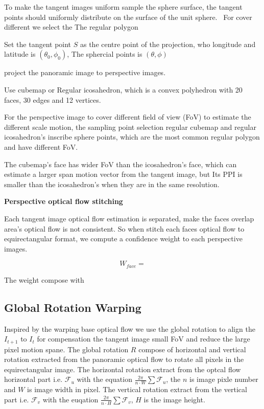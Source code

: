 To make the tangent images uniform sample the sphere surface, the tangent points should uniformly distribute on the surface of the unit sphere.~\cite{??}
For cover different we select the 
The regular polygon ~\cite{??} 


Set the tangent point $S$ as the centre point of the projection, who longitude and latitude is $(\theta_0, \phi_0)$,
The sphercial points is $(\theta, \phi)$

project the panoramic image to perspective images.

Use cubemap or Regular icosahedron, which is a convex polyhedron with 20 faces, 30 edges and 12 vertices.

For the perspective image to cover different field of view (FoV)  to estimate the different scale motion, the sampling point selection regular cubemap and regular icosahedron's inscribe sphere points, which are the most common regular polygon and have different FoV. ~\cite{?}

The cubemap's face has wider FoV than the icosahedron's face, which can estimate a larger span motion vector from the tangent image, but Its PPI is smaller than the icosahedron's when they are in the same resolution.


\textbf{Perspective optical flow stitching}

Each tangent image optical flow estimation is separated, make the faces overlap area's optical flow is not consistent.
So when stitch each faces optical flow to equirectangular format, we compute a confidence weight to each perspective images. 

\begin{equation}
W_{face} =
\end{equation}


The weight compose with 



\subsection{Global Rotation Warping}
\label{sec:approach:warping}

Inspired by the warping base optical flow \cite{?} we use the global rotation to align the $I_{t+1}$ to $I_{t}$ for compensation the tangent image small FoV and reduce the large pixel motion spane.
The global rotation $R$ compose of horizontal and vertical rotation extracted from the panoramic optical flow to rotate all pixels in the equirectangular image.
The horizontal rotation extract from the optcal flow horizontal part i.e. $\mathcal{F}_u$ with the equation $\frac{2\pi}{n\cdot W}\sum\mathcal{F}_u$, the $n$ is image pixle number and $W$ is image width in pixel.
The vertical rotation extract from the vertical part i.e. $\mathcal{F}_v$ with the euqation $\frac{2\pi}{n\cdot H}\sum\mathcal{F}_v$, $H$ is the image height.


